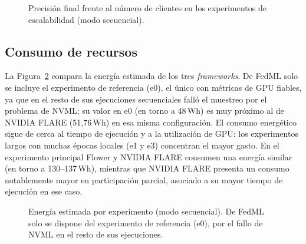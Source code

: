 \begin{figure}[htbp]
  \centering
  \caption{Precisión final frente al número de clientes en los experimentos de escalabilidad
  (modo secuencial).}
  \label{fig:comp-escala}
\end{figure}

\subsection{Consumo de recursos}\label{sec:comp-recursos}

La Figura~\ref{fig:comp-energia} compara la energía estimada de los tres \textit{frameworks}. De
FedML solo se incluye el experimento de referencia (e0), el único con métricas de GPU fiables, ya
que en el resto de sus ejecuciones secuenciales falló el muestreo por el problema de NVML; su
valor en e0 (en torno a 48\,Wh) es muy próximo al de NVIDIA FLARE (51{,}76\,Wh) en esa misma
configuración. El consumo energético sigue de cerca al tiempo de ejecución y a la utilización de
GPU: los experimentos largos con muchas épocas locales (e1 y e3) concentran el mayor gasto. En el
experimento principal Flower y NVIDIA FLARE consumen una energía similar (en torno a
130--137\,Wh), mientras que NVIDIA FLARE presenta un consumo notablemente mayor en participación
parcial, asociado a su mayor tiempo de ejecución en ese caso.

\begin{figure}[htbp]
  \centering
  \caption{Energía estimada por experimento (modo secuencial). De FedML solo se dispone del
  experimento de referencia (e0), por el fallo de NVML en el resto de sus ejecuciones.}
  \label{fig:comp-energia}
\end{figure}

